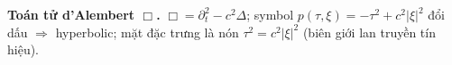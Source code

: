 \textbf{Toán tử d'Alembert $\Box$.}
$\Box = \partial_t^2 - c^2\Delta$; symbol $p(\tau,\xi)=-\tau^2+c^2|\xi|^2$ đổi dấu $\Rightarrow$ hyperbolic; mặt đặc trưng là nón $\tau^2=c^2|\xi|^2$ (biên giới lan truyền tín hiệu).
